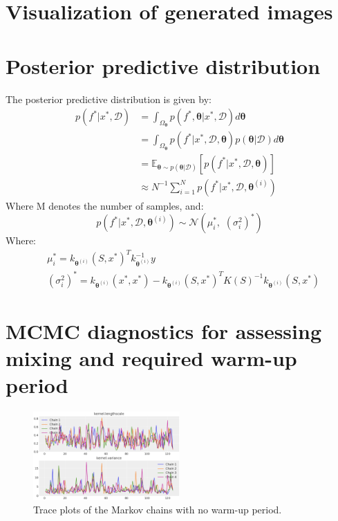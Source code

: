 \begin{appendices}

\section{Visualization of generated images}\label{appendiximages}


\section{Posterior predictive distribution}\label{appendix1}
The posterior predictive distribution is given by:
\begin{align}
    p(f^*|x^*,\mathcal{D}) &= \int_{\Omega_{\bm{\theta}}}p(f^*,{\bm{\theta}}|x^*,\mathcal{D})d{\bm{\theta}}\\
    &=\int_{\Omega_{\bm{\theta}}}p(f^*|x^*,\mathcal{D},{\bm{\theta}})p({\bm{\theta}}|\mathcal{D})d{\bm{\theta}}\\
    &=\mathbb{E}_{{\bm{\theta}}\sim p({\bm{\theta}}|\mathcal{D})}\left[p(f^*|x^*,\mathcal{D},{\bm{\theta}})\right]\\
    &\approx N^{-1}\sum_{i=1}^N p(f^*|x^*,\mathcal{D}, {\bm{\theta}}^{(i)})
\end{align}
Where M denotes the number of samples, and:
\begin{equation}
    p(f^*|x^*,\mathcal{D}, {\bm{\theta}}^{(i)}) \sim \mathcal{N}\left(\mu_i^*, \, \, (\sigma_i^2)^*\right)
\end{equation}
Where: 
\begin{align*}
    &\mu_i^*=k_{{\bm{\theta}}^{(i)}}(S,x^*)^Tk_{{\bm{\theta}}^{(i)}}^{-1}y\\
    &(\sigma_i^2)^*=k_{{\bm{\theta}}^{(i)}}(x^*,x^*)-k_{{\bm{\theta}}^{(i)}}(S,x^*)^TK(S)^{-1}k_{{\bm{\theta}}^{(i)}}(S,x^*)
\end{align*}

\section{MCMC diagnostics for assessing mixing and required warm-up period}\label{appendix2}

\begin{figure}[H]
    \centering
    \includegraphics[width=0.5\textwidth]{src/traceplotsdiagnostics.png}
    \caption{Trace plots of the Markov chains with no warm-up period.}
    \label{fig:mcmcdiag}
\end{figure}


\end{appendices}
